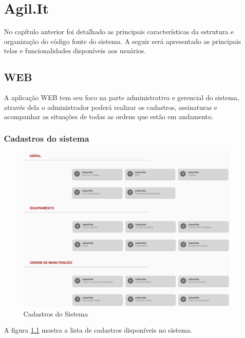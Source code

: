 \chapter{Agil.It}

No capítulo anterior foi detalhado as principais características da estrutura e organização do código fonte do sistema.
A seguir será apresentado as principais telas e funcionalidades disponíveis aos usuários.

\section{WEB}
A aplicação WEB tem seu foco na parte administrativa e gerencial do sistema, através dela o administrador poderá realizar os cadastros, assinaturas e acompanhar as situações de todas as ordens que estão em andamento.
\subsection{Cadastros do sistema}

\begin{figure}[H]
	\caption{\label{web-cadastros}Cadastros do Sistema}
	\begin{center}
		\includegraphics[scale=0.40]{./Figuras/agil.it/web-cadastros.png}
	\end{center}
\end{figure}

A figura \ref{web-cadastros} mostra a lista de cadastros disponíveis no sistema.

